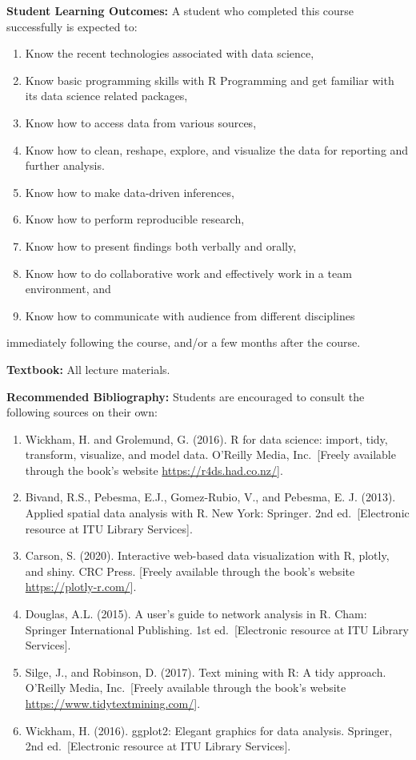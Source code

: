 \documentclass[
  12pt,
]{article}
\providecommand{\tightlist}{%
  \setlength{\itemsep}{0pt}\setlength{\parskip}{0pt}}
\begin{document}
\textbf{Student Learning Outcomes:} A student who completed this course
successfully is expected to:

\begin{enumerate}
\def\labelenumi{\arabic{enumi}.}
\tightlist
\item
  Know the recent technologies associated with data science,
\item
  Know basic programming skills with R Programming and get familiar with
  its data science related packages,
\item
  Know how to access data from various sources,
\item
  Know how to clean, reshape, explore, and visualize the data for
  reporting and further analysis.
\item
  Know how to make data-driven inferences,
\item
  Know how to perform reproducible research,
\item
  Know how to present findings both verbally and orally,
\item
  Know how to do collaborative work and effectively work in a team
  environment, and
\item
  Know how to communicate with audience from different disciplines
\end{enumerate}

immediately following the course, and/or a few months after the course.

\textbf{Textbook:} All lecture materials.

\textbf{Recommended Bibliography:} Students are encouraged to consult
the following sources on their own:

\begin{enumerate}
\def\labelenumi{\arabic{enumi}.}
\item
  Wickham, H. and Grolemund, G. (2016). R for data science: import,
  tidy, transform, visualize, and model data. O'Reilly Media,
  Inc.~{[}Freely available through the book's website
  \url{https://r4ds.had.co.nz/}{]}.
\item
  Bivand, R.S., Pebesma, E.J., Gomez-Rubio, V., and Pebesma, E. J.
  (2013). Applied spatial data analysis with R. New York: Springer. 2nd
  ed.~{[}Electronic resource at ITU Library Services{]}.
\item
  Carson, S. (2020). Interactive web-based data visualization with R,
  plotly, and shiny. CRC Press. {[}Freely available through the book's
  website \url{https://plotly-r.com/}{]}.
\item
  Douglas, A.L. (2015). A user's guide to network analysis in R. Cham:
  Springer International Publishing. 1st ed.~{[}Electronic resource at
  ITU Library Services{]}.
\item
  Silge, J., and Robinson, D. (2017). Text mining with R: A tidy
  approach. O'Reilly Media, Inc.~{[}Freely available through the book's
  website \url{https://www.tidytextmining.com/}{]}.
\item
  Wickham, H. (2016). ggplot2: Elegant graphics for data analysis.
  Springer, 2nd ed.~{[}Electronic resource at ITU Library Services{]}.
\end{enumerate}
\end{document}

